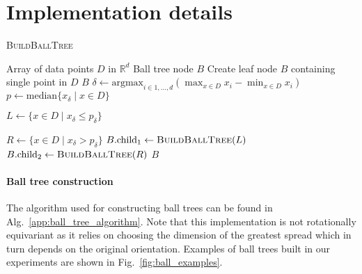 \section{Implementation details}
\label{appendix:implementation}

\begin{algorithm}[t]
\caption{\textsc{BuildBallTree}}
\begin{algorithmic}
 Array of data points $D$ in $\mathbb{R}^d$
 Ball tree node $B$
\STATE
{}
\STATE Create leaf node $B$ containing single point in $D$
 $B$
\ENDIF
\STATE
\STATE {}
\STATE $\delta \gets \text{argmax}_{i \in {1,\ldots,d}} (\max_{x \in D} x_i - \min_{x \in D} x_i)$
\STATE
\STATE {}
\STATE $p \gets \text{median}\{x_\delta \mid x \in D\}$

\STATE $L \gets \{x \in D \mid x_\delta \leq p_\delta\}$ 

\STATE $R \gets \{x \in D \mid  x_\delta > p_\delta\}$
\STATE
\STATE {}
\STATE $B.\text{child}_1 \gets \textsc{BuildBallTree}(L)$
\STATE $B.\text{child}_2 \gets \textsc{BuildBallTree}(R)$
\STATE
{} $B$
\end{algorithmic}
\label{app:ball_tree_algorithm}
\end{algorithm}

\paragraph{Ball tree construction}
The algorithm used for constructing ball trees \cite{Pedregosa2011ScikitlearnML} can be found in Alg.~\ref{app:ball_tree_algorithm}. Note that this implementation is not rotationally equivariant as it relies on choosing the dimension of the greatest spread which in turn depends on the original orientation. Examples of ball trees built in our experiments are shown in Fig.~\ref{fig:ball_examples}.

